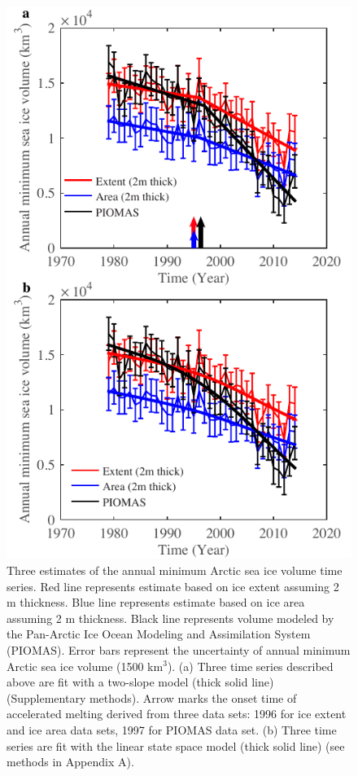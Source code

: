 \clearpage
\begin{figure}
	\centering
	\includegraphics{figs_app/FigS5.pdf}
	\caption[Three estimates of the annual minimum Arctic sea ice volume time series.]{Three estimates of the annual minimum Arctic sea ice volume time series.  Red line represents estimate based on ice extent assuming 2 m thickness.  Blue line represents estimate based on ice area assuming 2 m thickness. Black line represents volume modeled by the Pan-Arctic Ice Ocean Modeling and Assimilation System (PIOMAS)\cite[]{zhang2003modeling}.  Error bars represent the uncertainty of annual minimum Arctic sea ice volume (1500 km$^{3}$).  (a) Three time series described above are fit with a two-slope model (thick solid line) (Supplementary methods).  Arrow marks the onset time of accelerated melting derived from three data sets: 1996 for ice extent and ice area data sets, 1997 for PIOMAS data set. (b) Three time series are fit with the linear state space model (thick solid line) (see methods in Appendix A). }
	\label{fig:SI4_fig5}
\end{figure}

